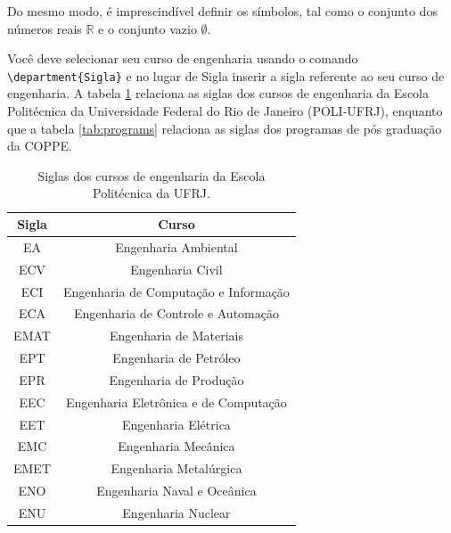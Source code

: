\documentclass[grad,numbers]{coppe}
\begin{document}
  Do mesmo modo, é imprescindível definir os símbolos, tal como o
  conjunto dos números reais $\mathbb{R}$ e o conjunto vazio $\emptyset$.
  
  Você deve selecionar seu curso de engenharia usando o comando \texttt{\textbackslash department\{Sigla\}} e no lugar de Sigla inserir a sigla referente ao seu curso de engenharia. A tabela \ref{tab:courses} relaciona as siglas dos cursos de engenharia da Escola Politécnica da Universidade Federal do Rio de Janeiro (POLI-UFRJ), enquanto que a tabela \ref{tab:programs} relaciona as siglas dos programas de pós graduação da COPPE.
  
  
  \begin{table}[h]
    \caption{Siglas dos cursos de engenharia da Escola Politécnica da UFRJ.}
    \label{tab:courses}
    \centering
    {\footnotesize
    \begin{tabular}{|c|c|}
      \hline
      Sigla & Curso\\
      \hline
      EA &  Engenharia Ambiental \\
      ECV & Engenharia Civil\\
      ECI & Engenharia de Computação e Informação \\
      ECA & Engenharia de Controle e Automação \\
      EMAT & Engenharia de Materiais\\
      EPT & Engenharia de Petróleo\\
      EPR & Engenharia de Produção\\
      EEC & Engenharia Eletrônica e de Computação\\
      EET & Engenharia Elétrica\\
      EMC & Engenharia Mecânica\\
      EMET & Engenharia Metalúrgica\\
      ENO & Engenharia Naval e Oceânica\\
      ENU & Engenharia Nuclear\\
      \hline
    \end{tabular}}
    \end{table}
    
\end{document}
